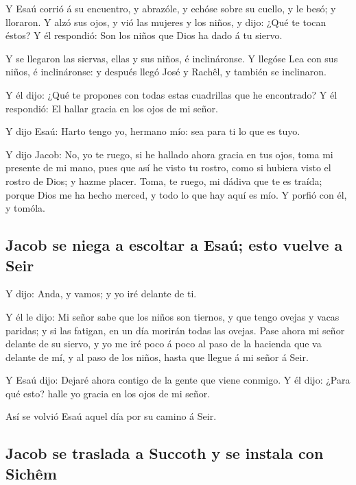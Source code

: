  Y Esaú corrió á su encuentro, y abrazóle, y echóse sobre
su cuello, y le besó; y lloraron.  Y alzó sus ojos, y vió
las mujeres y los niños, y dijo: ¿Qué te tocan éstos? Y él respondió:
Son los niños que Dios ha dado á tu siervo.

 Y se llegaron las siervas, ellas y sus niños, é
inclináronse.  Y llegóse Lea con sus niños, é
inclináronse: y después llegó José y Rachêl, y también se inclinaron.

 Y él dijo: ¿Qué te propones con todas estas cuadrillas
que he encontrado? Y él respondió: El hallar gracia en los ojos de mi
señor.

 Y dijo Esaú: Harto tengo yo, hermano mío: sea para ti lo
que es tuyo.

 Y dijo Jacob: No, yo te ruego, si he hallado ahora
gracia en tus ojos, toma mi presente de mi mano, pues que así he visto
tu rostro, como si hubiera visto el rostro de Dios; y hazme placer.
 Toma, te ruego, mi dádiva que te es traída; porque Dios
me ha hecho merced, y todo lo que hay aquí es mío. Y porfió con él, y
tomóla.

\hypertarget{jacob-se-niega-a-escoltar-a-esauxfa-esto-vuelve-a-seir}{%
\subsection{Jacob se niega a escoltar a Esaú; esto vuelve a
Seir}\label{jacob-se-niega-a-escoltar-a-esauxfa-esto-vuelve-a-seir}}

 Y dijo: Anda, y vamos; y yo iré delante de ti.

 Y él le dijo: Mi señor sabe que los niños son tiernos, y
que tengo ovejas y vacas paridas; y si las fatigan, en un día morirán
todas las ovejas.  Pase ahora mi señor delante de su
siervo, y yo me iré poco á poco al paso de la hacienda que va delante de
mí, y al paso de los niños, hasta que llegue á mi señor á Seir.

 Y Esaú dijo: Dejaré ahora contigo de la gente que viene
conmigo. Y él dijo: ¿Para qué esto? halle yo gracia en los ojos de mi
señor.

 Así se volvió Esaú aquel día por su camino á Seir.

\hypertarget{jacob-se-traslada-a-succoth-y-se-instala-con-sichuxeam}{%
\subsection{Jacob se traslada a Succoth y se instala con
Sichêm}\label{jacob-se-traslada-a-succoth-y-se-instala-con-sichuxeam}}

